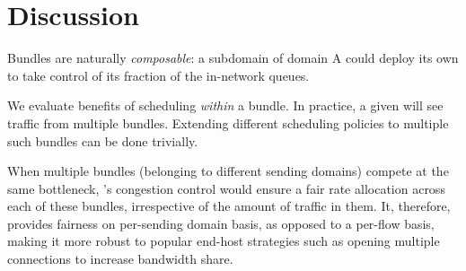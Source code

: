 \section{Discussion}\label{s:discussion}

 Bundles are naturally \emph{composable}: a subdomain of domain A could deploy its own \name to take control of its fraction of the in-network queues. 

 We evaluate benefits of scheduling \emph{within} a bundle. In practice, a given \inbox will see traffic from multiple bundles. Extending different scheduling policies to multiple such bundles can be done trivially.

 When multiple bundles (belonging to different sending domains) compete at the same bottleneck, \name's congestion control would ensure a fair rate allocation across each of these bundles, irrespective of the amount of traffic in them. It, therefore, provides fairness on per-sending domain basis, as opposed to a per-flow basis, making it more robust to popular end-host strategies such as opening multiple connections to increase bandwidth share. 
